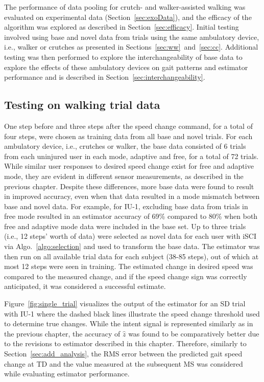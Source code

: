 The performance of data pooling for crutch- and walker-assisted walking was evaluated on experimental data (Section~\ref{sec:exoData}), and the efficacy of the algorithm was explored as described in Section~\ref{sec:efficacy}. Initial testing involved using base and novel data from trials using the same ambulatory device, i.e., walker or crutches as presented in Sections~\ref{sec:ww}~and~\ref{sec:cc}. Additional testing was then performed to explore the interchangeability of base data to explore the effects of these ambulatory devices on gait patterns and estimator performance and is described in Section~\ref{sec:interchangeability}.

\subsection{Testing on walking trial data}
One step before and three steps after the speed change command, for a total of four steps, were chosen as training data from all base and novel trials. For each ambulatory device, i.e., crutches or walker, the base data consisted of 6 trials from each uninjured user in each mode, adaptive and free, for a total of 72 trials. While similar user responses to desired speed change exist for free and adaptive mode, they are evident in different sensor measurements, as described in the previous chapter. Despite these differences, more base data were found to result in improved accuracy, even when that data resulted in a mode mismatch between base and novel data. For example, for IU-1, excluding base data from trials in free mode resulted in an estimator accuracy of 69\% compared to 80\% when both free and adaptive mode data were included in the base set. Up to three trials (i.e., 12 steps' worth of data) were selected as novel data for each user with iSCI via Algo.~\ref{algo:selection} and used to transform the base data. The estimator was then run on all available trial data for each subject (38-85 steps), out of which at most 12 steps were seen in training. The estimated change in desired speed was compared to the measured change, and if the speed change sign was correctly anticipated, it was considered a successful estimate.

Figure~\ref{fig:single_trial} visualizes the output of the estimator for an SD trial with IU-1 where the dashed black lines illustrate the speed change threshold used to determine true changes. While the intent signal is represented similarly as in the previous chapter, the accuracy of $ \hat{z} $ was found to be comparatively better due to the revisions to estimator described in this chapter. Therefore, similarly to Section~\ref{sec:add_analysis}, the RMS error between the predicted gait speed change at TD and the value measured at the subsequent MS was considered while evaluating estimator performance. 

